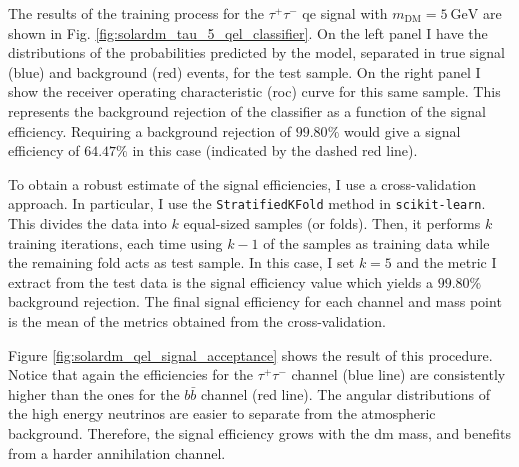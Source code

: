 The results of the training process for the $\tau^{+}\tau^{-}$ \gls{qe} signal with $m_{\mathrm{DM}} = 5 \ \mathrm{GeV}$ are shown in Fig. \ref{fig:solardm_tau_5_qel_classifier}. On the left panel I have the distributions of the probabilities predicted by the model, separated in true signal (blue) and background (red) events, for the test sample. On the right panel I show the receiver operating characteristic (\gls{roc}) curve for this same sample. This represents the background rejection of the classifier as a function of the signal efficiency. Requiring a background rejection of $99.80\%$ would give a signal efficiency of $64.47\%$ in this case (indicated by the dashed red line).

To obtain a robust estimate of the signal efficiencies, I use a cross-validation approach. In particular, I use the \texttt{StratifiedKFold} method in \texttt{scikit-learn}. This divides the data into $k$ equal-sized samples (or folds). Then, it performs $k$ training iterations, each time using $k-1$ of the samples as training data while the remaining fold acts as test sample. In this case, I set $k=5$ and the metric I extract from the test data is the signal efficiency value which yields a $99.80\%$ background rejection. The final signal efficiency for each channel and mass point is the mean of the metrics obtained from the cross-validation.

Figure \ref{fig:solardm_qel_signal_acceptance} shows the result of this procedure. Notice that again the efficiencies for the $\tau^{+}\tau^{-}$ channel (blue line) are consistently higher than the ones for the $b\bar{b}$ channel (red line). The angular distributions of the high energy neutrinos are easier to separate from the atmospheric background. Therefore, the signal efficiency grows with the \gls{dm} mass, and benefits from a harder annihilation channel.


